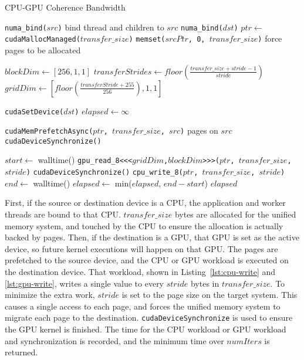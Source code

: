 \begin{algorithm}[H]
	\caption{CPU-GPU Coherence Bandwidth}
	\label{alg:um-coherence-bw}
	\begin{algorithmic}[1]
		\Statex
				
		\State \texttt{numa\_bind($src$)} \Comment bind thread and children to $src$
		\EndIf
		\State \texttt{numa\_bind($dst$)}
		\EndIf
		\State $ptr \gets$ \texttt{cudaMallocManaged($transfer\_size$)}
		\State \texttt{memset($srcPtr$, 0, $transfer\_size$)} \Comment force pages to be allocated
				        
				
		\State $blockDim \gets [256,1,1]$
		\State $transferStrides \gets floor(\frac{transfer\_size + stride - 1}{stride})$
		\State $gridDim \gets [floor(\frac{transferStride + 255}{256}), 1, 1]$
				
		\State \texttt{cudaSetDevice($dst$)}
		\EndIf
		\State $elapsed \gets \infty$
				
		\State \texttt{cudaMemPrefetchAsync($ptr$, $transfer\_size$, $src$)} \Comment pages on $src$
		\State \texttt{cudaDeviceSynchronize()}
				
		\State $start \gets$ walltime()
		\State \texttt{gpu\_read\_8<<<$gridDim$,$blockDim$>>>($ptr$, $transfer\_size$, $stride$)}
		\State \texttt{cudaDeviceSynchronize()}
		\Else
		\State \texttt{cpu\_write\_8($ptr$, $transfer\_size$, $stride$)}
		\EndIf
		\State $end \gets$ walltime()
		\State $elapsed \gets$ min($elapsed$, $end-start$)
		\EndFor
		\State \Return $elapsed$
		\EndFunction
				
	\end{algorithmic}
\end{algorithm}

First, if the source or destination device is a CPU, the application and worker threads are bound to that CPU.
$transfer\_size$ bytes are allocated for the unified memory system, and touched by the CPU to ensure the allocation is actually backed by pages.
Then, if the destination is a GPU, that GPU is set as the active device, so future kernel executions will happen on that GPU.
The pages are prefetched to the source device, and the CPU or GPU workload is executed on the destination device.
That workload, shown in Listing~\ref{lst:cpu-write} and \ref{lst:gpu-write}, writes a single value to every $stride$ bytes in $transfer\_size$.
To minimize the extra work, $stride$ is set to the page size on the target system.
This causes a single access to each page, and forces the unified memory system to migrate each page to the destination.
\texttt{cudaDeviceSynchronize} is used to ensure the GPU kernel is finished.
The time for the CPU workload or GPU workload and synchronization is recorded, and the minimum time over $numIters$ is returned.

